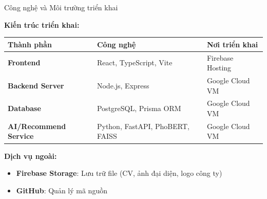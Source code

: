 \documentclass[aspectratio=169,xcolor=dvipsnames, t]{beamer}
\begin{document}
\begin{frame}{Công nghệ và Môi trường triển khai}
\justifying

\textbf{Kiến trúc triển khai:}

\begin{table}[H]
\centering
\small
\begin{tabular}{|p{4cm}|p{3.5cm}|p{3cm}|}
\hline
\textbf{Thành phần} & \textbf{Công nghệ} & \textbf{Nơi triển khai} \\
\hline
\textbf{Frontend} & React, TypeScript, Vite & Firebase Hosting \\
\hline
\textbf{Backend Server} & Node.js, Express & Google Cloud VM \\
\hline
\textbf{Database} & PostgreSQL, Prisma ORM & Google Cloud VM \\
\hline
\textbf{AI/Recommend Service} & Python, FastAPI, PhoBERT, FAISS & Google Cloud VM \\
\hline
\end{tabular}
\end{table}

\vspace{0.3cm}
\textbf{Dịch vụ ngoài:}
\begin{itemize}
    \item \textbf{Firebase Storage}: Lưu trữ file (CV, ảnh đại diện, logo công ty)
    \item \textbf{GitHub}: Quản lý mã nguồn
\end{itemize}

\end{frame}

\end{document}
